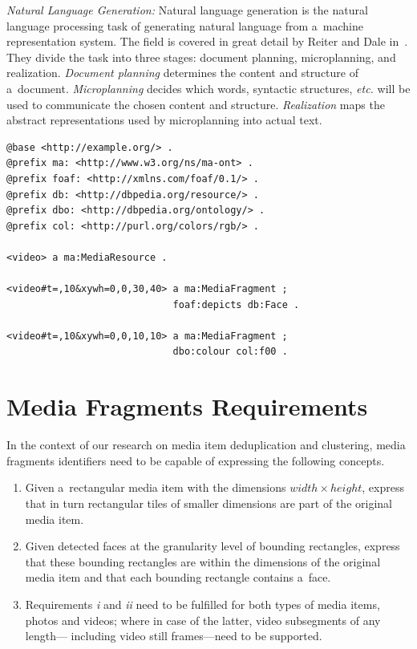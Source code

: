 \documentclass{article}
\begin{document}
\noindent \textit{Natural Language Generation:}
Natural language generation is the natural language processing task
of generating natural language from a~machine representation system.
The field is covered in great detail
by Reiter and Dale in~\cite{reiter2000building}.
They divide the task into three stages:
document planning, microplanning, and realization.
\emph{Document planning} determines the content and structure of a~document.
\emph{Microplanning} decides which words, syntactic structures, \emph{etc.}
will be used to communicate the chosen content and structure.
\emph{Realization} maps the abstract representations
used by microplanning into actual text.

\begin{lstlisting}[caption={Description of two 10~sec long media fragments:
  \textit{(i)}~a~tile of dimensions $ 30 \times 40 $ pixels
  starting at pixel coordinates $ (0, 0) $
  that contains a~face; and
  \textit{(ii)}~a~tile of dimensions $ 10 \times 10 $ pixels
  starting at pixel coordinates $ (0, 0) $ of red color},
  label=code:media-fragment, float=b!]
@base <http://example.org/> .
@prefix ma: <http://www.w3.org/ns/ma-ont> .
@prefix foaf: <http://xmlns.com/foaf/0.1/> .
@prefix db: <http://dbpedia.org/resource/> .
@prefix dbo: <http://dbpedia.org/ontology/> .
@prefix col: <http://purl.org/colors/rgb/> .

<video> a ma:MediaResource .

<video#t=,10&xywh=0,0,30,40> a ma:MediaFragment ;
                             foaf:depicts db:Face .
                             
<video#t=,10&xywh=0,0,10,10> a ma:MediaFragment ;
                             dbo:colour col:f00 .
\end{lstlisting}

\section{Media Fragments Requirements}
\label{sec:media-fragment-requirements}

In the context of our research on media item deduplication and clustering,
media fragments identifiers need to be capable of expressing the following concepts.

\begin{enumerate}[i]
  \itemsep0em 
  \item Given a~rectangular media item with the dimensions $ width \times height $,
    express that in turn rectangular tiles
    of smaller dimensions are part of the original media item.
  \item Given detected faces at the granularity level of bounding rectangles,
    express that these bounding rectangles are within the dimensions
    of the original media item and that each bounding rectangle contains a~face.
  \item Requirements \textit{i} and \textit{ii} need to be fulfilled for both
    types of media items, photos and videos;
    where in case of the latter, video subsegments of any length---%
    including video still frames---need to be supported.
\end{enumerate}
\end{document}
